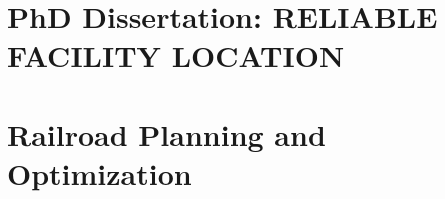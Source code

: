 \documentclass[twoside,openright,titlepage,numbers=noenddot,headinclude,%
               footinclude=true,cleardoublepage=empty,abstractoff, %
               BCOR=5mm,paper=a4,fontsize=11pt,%
               ngerman,american,%
               ]{scrreprt}
\begin{document}
\raggedbottom
{} %
\pagestyle{plain}




\cleardoublepage
\cleardoublepage
\cleardoublepage
\cleardoublepage


\cleardoublepage
\pagestyle{scrheadings}
\cleardoublepage

\part{PhD Dissertation: RELIABLE FACILITY LOCATION}\label{pt:manual}


\cleardoublepage

\part{Railroad Planning and Optimization}\label{pt:railroad}

\cleardoublepage


\cleardoublepage
\end{document}
